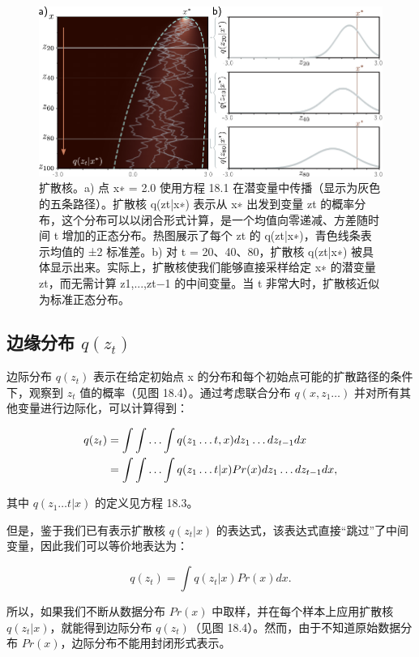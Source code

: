 \documentclass[lang=cn,newtx,10pt,scheme=chinese]{elegantbook}
\begin{document}
\begin{figure}[ht!]
\centering
\includegraphics[width=0.7\linewidth]{PDFFigures/UDLChap18PDF/DiffusionKernel.pdf}
\caption{扩散核。a) 点 x∗ = 2.0 使用方程 18.1 在潜变量中传播（显示为灰色的五条路径）。扩散核 q(zt|x∗) 表示从 x∗ 出发到变量 zt 的概率分布，这个分布可以以闭合形式计算，是一个均值向零递减、方差随时间 t 增加的正态分布。热图展示了每个 zt 的 q(zt|x∗)，青色线条表示均值的 ±2 标准差。b) 对 t = 20、40、80，扩散核 q(zt|x∗) 被具体显示出来。实际上，扩散核使我们能够直接采样给定 x∗ 的潜变量 zt，而无需计算 z1,...,zt−1 的中间变量。当 t 非常大时，扩散核近似为标准正态分布。}
\end{figure}


\subsection{边缘分布 \texorpdfstring{\(q(z_t)\)}{} }
边际分布 \(q(z_t)\) 表示在给定初始点 x 的分布和每个初始点可能的扩散路径的条件下，观察到 \(z_t\) 值的概率（见图 18.4）。通过考虑联合分布 \(q(x, z_1\ldots)\) 并对所有其他变量进行边际化，可以计算得到：


\begin{align}
q(z_t) &= \int \int \ldots \int q(z_1\ldots t, x) dz_1\ldots dz_{t-1}dx \notag \\
&= \int \int \ldots \int q(z_1\ldots t|x) Pr(x) dz_1\ldots dz_{t-1}dx, 
\end{align} 


其中 \(q(z_1\ldots t|x)\) 的定义见方程 18.3。

但是，鉴于我们已有表示扩散核 \(q(z_t|x)\) 的表达式，该表达式直接“跳过”了中间变量，因此我们可以等价地表达为：

\begin{equation}
q(z_t) = \int q(z_t|x) Pr(x)dx. 
\end{equation}

所以，如果我们不断从数据分布 \(Pr(x)\) 中取样，并在每个样本上应用扩散核 \(q(z_t|x)\)，就能得到边际分布 \(q(z_t)\)（见图 18.4）。然而，由于不知道原始数据分布 \(Pr(x)\)，边际分布不能用封闭形式表示。
\end{document}
